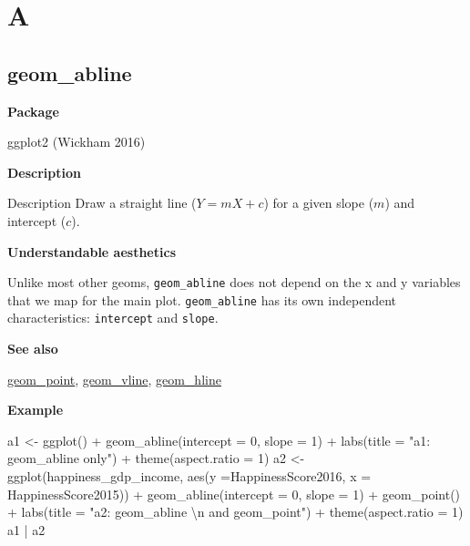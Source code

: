 \documentclass[
  letterpaper,
  DIV=11,
  numbers=noendperiod]{scrreprt}
\newenvironment{Shaded}{\begin{snugshade}}{\end{snugshade}}
\newcommand{\AttributeTok}[1]{\textcolor[rgb]{0.40,0.45,0.13}{#1}}
\newcommand{\DecValTok}[1]{\textcolor[rgb]{0.68,0.00,0.00}{#1}}
\newcommand{\FunctionTok}[1]{\textcolor[rgb]{0.28,0.35,0.67}{#1}}
\newcommand{\NormalTok}[1]{\textcolor[rgb]{0.00,0.23,0.31}{#1}}
\newcommand{\OtherTok}[1]{\textcolor[rgb]{0.00,0.23,0.31}{#1}}
\newcommand{\SpecialCharTok}[1]{\textcolor[rgb]{0.37,0.37,0.37}{#1}}
\newcommand{\StringTok}[1]{\textcolor[rgb]{0.13,0.47,0.30}{#1}}
\begin{document}

\chapter{A}\label{sec-a}

\section{geom\_abline}\label{abline}

\textbf{Package}

ggplot2 (Wickham 2016)

\textbf{Description}

Description Draw a straight line (\(Y=mX+c\)) for a given slope (\(m\))
and intercept (\(c\)).

\textbf{Understandable aesthetics}

Unlike most other geoms, \texttt{geom\_abline} does not depend on the x
and y variables that we map for the main plot. \texttt{geom\_abline} has
its own independent characteristics: \texttt{intercept} and
\texttt{slope}.

\textbf{See also}

\hyperref[point]{geom\_point}, \hyperref[vline]{geom\_vline},
\hyperref[hline]{geom\_hline}

\textbf{Example}

\begin{Shaded}
\begin{Highlighting}[]
\NormalTok{a1 }\OtherTok{\textless{}{-}} \FunctionTok{ggplot}\NormalTok{() }\SpecialCharTok{+}
  \FunctionTok{geom\_abline}\NormalTok{(}\AttributeTok{intercept =} \DecValTok{0}\NormalTok{, }\AttributeTok{slope =} \DecValTok{1}\NormalTok{) }\SpecialCharTok{+}
  \FunctionTok{labs}\NormalTok{(}\AttributeTok{title =} \StringTok{"a1: geom\_abline only"}\NormalTok{) }\SpecialCharTok{+}
  \FunctionTok{theme}\NormalTok{(}\AttributeTok{aspect.ratio =} \DecValTok{1}\NormalTok{)}
\NormalTok{a2 }\OtherTok{\textless{}{-}} \FunctionTok{ggplot}\NormalTok{(happiness\_gdp\_income, }\FunctionTok{aes}\NormalTok{(}\AttributeTok{y =}\NormalTok{HappinessScore2016, }\AttributeTok{x =}\NormalTok{ HappinessScore2015)) }\SpecialCharTok{+}
  \FunctionTok{geom\_abline}\NormalTok{(}\AttributeTok{intercept =} \DecValTok{0}\NormalTok{, }\AttributeTok{slope =} \DecValTok{1}\NormalTok{) }\SpecialCharTok{+}
  \FunctionTok{geom\_point}\NormalTok{() }\SpecialCharTok{+}
  \FunctionTok{labs}\NormalTok{(}\AttributeTok{title =} \StringTok{"a2: geom\_abline }\SpecialCharTok{\textbackslash{}n}\StringTok{ and geom\_point"}\NormalTok{) }\SpecialCharTok{+}
  \FunctionTok{theme}\NormalTok{(}\AttributeTok{aspect.ratio =} \DecValTok{1}\NormalTok{)}
\NormalTok{a1 }\SpecialCharTok{|}\NormalTok{ a2}
\end{Highlighting}
\end{Shaded}
\end{document}
